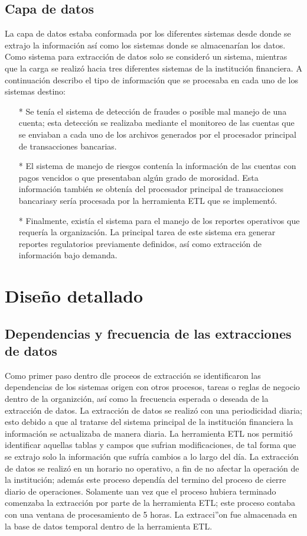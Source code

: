 \documentclass[a4paper,openright,12pt]{book}
\begin{document}
\section{Capa de datos}
La capa de datos estaba conformada por los diferentes sistemas desde donde se extrajo la información así como los sistemas donde se almacenarían los datos. Como sistema para extracción de datos solo se consideró un sistema, mientras que la carga se realizó hacia tres diferentes sistemas de la institución financiera. A continuación describo el tipo de información que se procesaba en cada uno de los sistemas destino:
\begin{itemize}
\item[*] Se tenía el sistema de detección de fraudes o posible mal manejo de una cuenta; esta detección se realizaba mediante el monitoreo de las cuentas que se enviaban a cada uno de los archivos generados por el procesador principal de transacciones bancarias.
\item[*] El sistema de manejo de riesgos contenía la información de las cuentas con pagos vencidos o que presentaban algún grado de morosidad. Esta información también se obtenía del procesador principal de transacciones bancariasy sería procesada por la herramienta ETL que se implementó.
\item[*]Finalmente, existía el sistema para el manejo de los reportes operativos que requería la organización. La principal tarea de este sistema era generar reportes regulatorios previamente definidos, así como extracción de información bajo demanda.
\end{itemize}

\chapter{Diseño detallado}
\section{Dependencias y frecuencia de las extracciones de datos}
Como primer paso dentro dle proceos de extracción se identificaron las dependencias de los sistemas origen con otros procesos, tareas o reglas de negocio dentro de la organizción, así como la frecuencia esperada o deseada de la extracción de datos. La extracción de datos se realizó con una periodicidad diaria; esto debido a que al tratarse del sistema principal de la institución financiera la información se actualizaba de manera diaria. La herramienta ETL nos permitió identificar aquellas tablas y campos que sufrian modificaciones, de tal forma que se extrajo solo la información que sufría cambios a lo largo del día. La extracción de datos se realizó en un horario no operativo, a fin de no afectar la operación de la institución; además este proceso dependía del termino del proceso de cierre diario de operaciones. Solamente uan vez que el proceso hubiera terminado comenzaba la extracción por parte de la herramienta ETL; este proceso contaba con una ventana de procesamiento de 5 horas. La extracci''on fue almacenada en la base de datos temporal dentro de la herramienta ETL.
\end{document}
